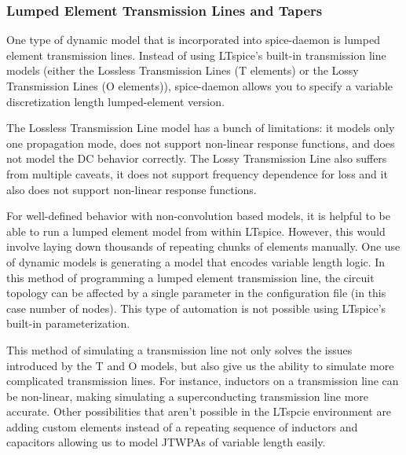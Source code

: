 \documentclass{article}
\begin{document}
\subsubsection{Lumped Element Transmission Lines and Tapers}\label{tapers_section}

One type of dynamic model that is incorporated into spice-daemon is lumped 
element transmission lines. Instead of using LTspice's built-in transmission
line models (either the Lossless Transmission Lines (T elements) or the 
Lossy Transmission Lines (O elements)), spice-daemon allows you to specify a
variable discretization length lumped-element version. 

The Lossless Transmission Line model has a bunch of limitations: it models only one propagation mode,
 does not support non-linear response functions, and does not 
model the DC behavior correctly. The Lossy Transmission Line also suffers from multiple caveats,
it does not support frequency dependence for loss and it also does not support non-linear response 
functions. %

For well-defined behavior with non-convolution based models, it is helpful to be able to run
a lumped element model from within LTspice. However, this would involve laying down thousands 
of repeating chunks of elements manually. One use of dynamic models is generating a model 
that encodes variable length logic. In this method of programming a lumped element transmission
line, the circuit topology can be affected by a single parameter in the configuration file 
(in this case number of nodes). This type of automation is not possible using LTspice's built-in
parameterization.

This method of simulating a transmission line not only solves the issues introduced by the
T and O models, but also give us the ability to simulate more complicated transmission lines.
For instance, inductors on a transmission line can be non-linear, making simulating a superconducting
transmission line more accurate. Other possibilities that aren't possible in the LTspcie environment
are adding custom elements instead of a repeating sequence of inductors and capacitors allowing us to
model JTWPAs of variable length easily.
\end{document}
